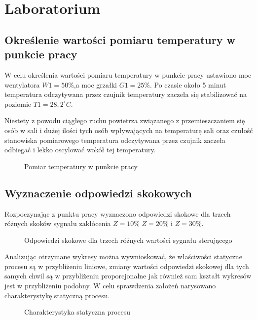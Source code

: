 \chapter{Laboratorium}

\section{Określenie wartości pomiaru temperatury w punkcie pracy}

W celu określenia wartości pomiaru temperatury w punkcie pracy ustawiono moc wentylatora  $W1 = 50\%$,a moc grzałki $G1 = 25\%$.
Po czasie około 5 minut temperatura odczytywana przez czujnik temperatury zaczeła się stabilizować  na poziomie  $T1 = 28,2^{\circ} C$.

Niestety z powodu ciągłego ruchu powietrza związanego z przemieszczaniem się osób w sali i dużej ilości tych osób wpływających na temperaturę sali oraz czułość stanowiska pomiarowego temperatura odczytywana przez czujnik zaczeła odbiegać i lekko oscylować wokół tej temperatury.

\begin{figure}[H]
\centering

\caption{Pomiar temperatury w punkcie pracy}
\end{figure}

\section{Wyznaczenie odpowiedzi skokowych}

Rozpoczynając z punktu pracy wyznaczono odpowiedzi skokowe dla trzech różnych skoków sygnału zakłócenia  $Z = 10\%$  $Z = 20\%$ i $Z = 30\%$.

\begin{figure}[H]
\centering

\caption{Odpowiedzi skokowe dla trzech różnych wartości sygnału sterującego}
\end{figure}

Analizując otrzymane wykresy można wywnioskować, że właściwości statyczne procesu są w przybliżeniu liniowe, zmiany wartości odpowiedzi skokowej dla tych samych chwil są w przybliżeniu proporcjonalne jak również sam kształt wykresów jest w przybliżeniu podobny. W celu sprawdzenia założeń narysowano charakterystykę statyczną procesu.

\begin{figure}[H]
\centering

\caption{Charakterystyka statyczna procesu}
\end{figure}

